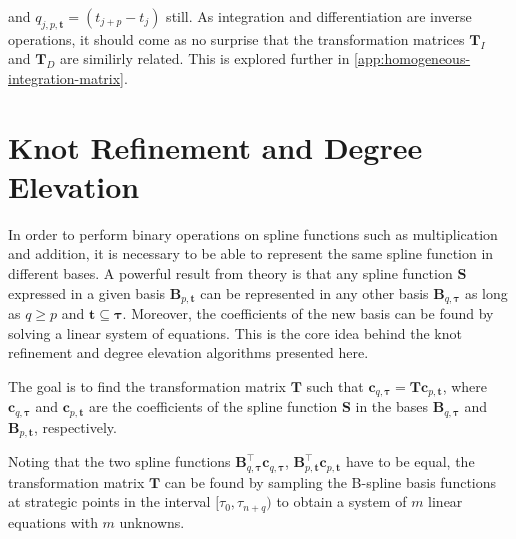 and $q_{j,p,\mathbf{t}} = (t_{j+p}-t_j)$ still.
As integration and differentiation are inverse operations, it should come as no surprise that the transformation matrices $\mathbf T_I$ and $\mathbf T_D$ are similirly related. This is explored further in \cref{app:homogeneous-integration-matrix}.


\section{Knot Refinement and Degree Elevation}
In order to perform binary operations on spline functions such as multiplication and addition, it is necessary to be able to represent the same spline function in different bases. A powerful result from theory is that any spline function $\mathbf S$ expressed in a given basis $\mathbf B_{p,\mathbf t}$ can be represented in any other basis $\mathbf B_{q,\boldsymbol \tau}$ as long as $q \geq p$ and $\mathbf t \subseteq \boldsymbol \tau$. Moreover, the coefficients of the new basis can be found by solving a linear system of equations. This is the core idea behind the knot refinement and degree elevation algorithms presented here.

The goal is to find the transformation matrix $\mathbf T$ such that $\mathbf c_{q, \boldsymbol \tau} = \mathbf T \mathbf c_{p, \mathbf t}$, where $\mathbf c_{q, \boldsymbol \tau}$ and $\mathbf c_{p, \mathbf t}$ are the coefficients of the spline function $\mathbf S$ in the bases $\mathbf B_{q,\boldsymbol \tau}$ and $\mathbf B_{p,\mathbf t}$, respectively.

Noting that the two spline functions $\mathbf B_{q,\boldsymbol \tau}^\top \mathbf c_{q, \boldsymbol \tau}$, $\mathbf B_{p,\mathbf t}^\top \mathbf c_{p, \mathbf t}$ have to be equal,
the transformation matrix $\mathbf T$ can be found by sampling the B-spline basis functions at strategic points in the interval $[\tau_0, \tau_{n+q})$ to obtain a system of $m$ linear equations with $m$ unknowns.

